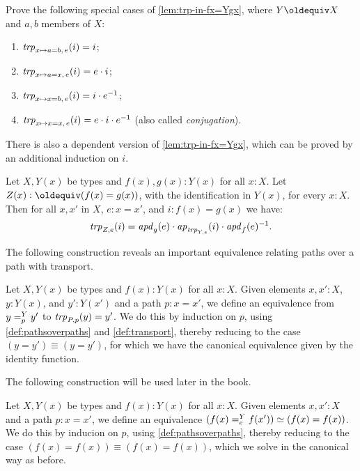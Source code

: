 \begin{xca}\label{xca:trp-in-a/x=b/x}
Prove the following special cases of \cref{lem:trp-in-fx=Ygx},
where $Y\jdeq X$ and $a,b$ members of $X$:
\begin{enumerate}
\item $\mathop{\mathit{trp}_{x\mapsto a=b,\,e}} (i) = i$;
\item\label{trp-in-a=x} $\mathop{\mathit{trp}_{x\mapsto a=x,\,e}} (i) = e\cdot i$;
\item $\mathop{\mathit{trp}_{x\mapsto x=b,\,e}} (i) = i \cdot e^{-1}$;
\item \label{trp-in-x=x}$\mathop{\mathit{trp}_{x\mapsto x=x,\,e}} (i) = e \cdot i\cdot e^{-1}$ 
(also called \emph{conjugation}).
\end{enumerate}
\end{xca}

There is also a dependent version of \cref{lem:trp-in-fx=Ygx},
which can be proved by an additional induction on $i$.

\begin{lemma}\label{lem:trp-in-fx=Yxgx}
Let $X,Y(x)$ be types and $f(x),g(x): Y(x)$ for all $x:X$. 
Let $Z(x)\defeq (f(x)=g(x))$,
with the identification in $Y(x)$, for every $x:X$. 
Then for all $x,x'$ in $X$, $e: x=x'$, and $i: f(x)=g(x)$ we have:
\[
\mathop{\mathit{trp}_{Z, e}} (i) = \mathop{{\it apd}_{g}}(e) \cdot \mathop{{\it ap}_{\mathop{\mathit{trp}_{Y,e}}}}(i) \cdot \mathop{{\it apd}_{f}}(e)^{-1}.
\]
\end{lemma}

The following construction reveals an important equivalence
relating paths over a path with transport.

\begin{definition}\label{def:pathover-trp}
Let $X,Y(x)$ be types and $f(x): Y(x)$ for all $x:X$.
Given elements $x,x':X$, $y:Y(x)$, and
  $y':Y(x')$ and a path $p : x = x'$,
we define an equivalence from $y =^{Y}_{p} y'$ to $\mathop{\mathit{trp}_{P,p}}(y)=y'$.
We do this by induction on $p$, using \cref{def:pathsoverpaths} and
\cref{def:transport}, thereby reducing to the case
$(y=y') \equiv (y=y')$, for which we have the canonical equivalence
given by the identity function.
\end{definition}

The following construction will be used later in the book.

\begin{definition}\label{def:Dan's-lemma}
Let $X,Y(x)$ be types and $f(x): Y(x)$ for all $x:X$.
Given elements $x,x':X$ and a path $p : x = x'$, we define an equivalence
$(f(x) =^{Y}_{e} f(x')) \simeq (f(x)=f(x))$.
We do this by inducion on $p$, using \cref{def:pathsoverpaths},
thereby reducing to the case $(f(x)=f(x)) \equiv (f(x)=f(x))$, 
which we solve in the canonical way as before.
\end{definition}


